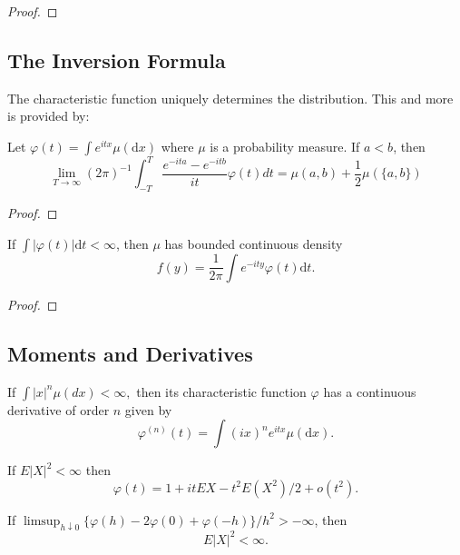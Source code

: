 \begin{proof}

\end{proof}

\subsection{The Inversion Formula}

The characteristic function uniquely determines the distribution. This and more is provided by:
\begin{theorem}
	Let $\varphi(t)=\int e^{itx}\mu(\mathrm{d}x)$ where $\mu$ is a probability measure. If $a<b$, then
	\begin{equation}
		\lim _{T \rightarrow \infty}(2 \pi)^{-1} \int_{-T}^{T} \frac{e^{-i t a}-e^{-i t b}}{i t} \varphi(t) d t=\mu(a, b)+\frac{1}{2} \mu(\{a, b\})
	\end{equation}
\end{theorem}

\begin{proof}

\end{proof}

\begin{theorem}
	If $\int|\varphi(t)|\mathrm{d}t<\infty$, then $\mu$ has bounded continuous density
	\begin{equation}
		f(y)=\frac{1}{2\pi}\int e^{-ity}\varphi(t) \mathrm{d}t.
	\end{equation}
\end{theorem}

\begin{proof}

\end{proof}

\subsection{Moments and Derivatives}

\begin{theorem}
	If $\int|x|^{n}\mu(d x)<\infty,$ then its characteristic function $\varphi$ has a continuous derivative of order $n$ given by
	\begin{equation}
		\varphi^{(n)}(t)=\int(i x)^{n}e^{itx}\mu(\mathrm{d}x).
	\end{equation}
\end{theorem}

\begin{theorem}
	If $E|X|^{2}<\infty$ then
	\begin{equation}
		\varphi(t)=1+itEX-t^{2}E\left(X^{2}\right)/2+o\left(t^{2}\right).
	\end{equation}
\end{theorem}

\begin{theorem}
	If $\limsup_{h\downarrow 0}\{\varphi(h)-2\varphi(0)+\varphi(-h)\}/h^{2}>-\infty$, then
	\begin{equation}
		E|X|^{2}<\infty.
	\end{equation}
\end{theorem}
